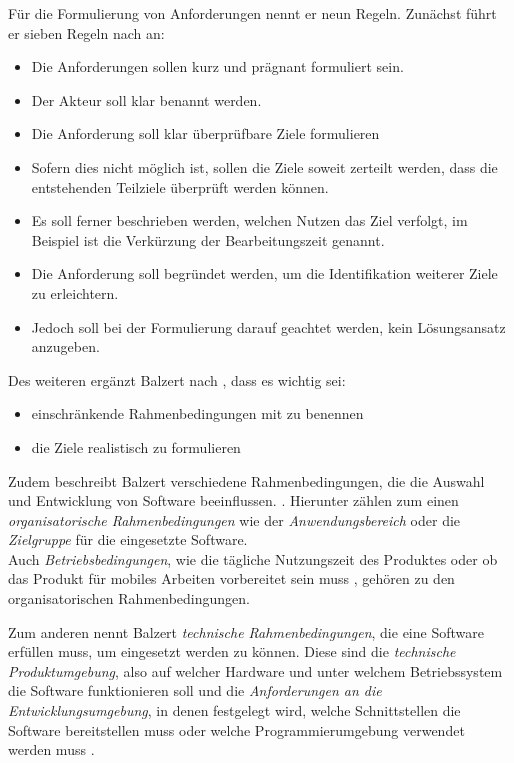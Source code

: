 Für die Formulierung von Anforderungen nennt er neun Regeln. Zunächst führt er sieben Regeln nach \cite[][S. 100 ff.]{Pohl2007} an:
\begin{itemize}
\item Die Anforderungen sollen kurz und prägnant formuliert sein. 
\item Der Akteur soll klar benannt werden.
\item Die Anforderung soll klar überprüfbare Ziele formulieren
\item Sofern dies nicht möglich ist, sollen die Ziele soweit zerteilt werden, dass die entstehenden Teilziele überprüft werden können.
\item Es soll ferner beschrieben werden, welchen Nutzen das Ziel verfolgt, im Beispiel ist die Verkürzung der Bearbeitungszeit genannt.
\item Die Anforderung soll begründet werden, um die Identifikation weiterer Ziele zu erleichtern. 
\item Jedoch soll bei der Formulierung darauf geachtet werden, kein Lösungsansatz anzugeben. 
\end{itemize}
Des weiteren ergänzt Balzert nach \cite[][S. 100 f.]{Rupp2007}, dass es wichtig sei:
\begin{itemize}
\item einschränkende Rahmenbedingungen mit zu benennen 
\item die Ziele realistisch zu formulieren 
\end{itemize}
\citep[für den gesamten Abschnitt vgl.][S. 457 ff.]{Balzert2010}


Zudem beschreibt Balzert verschiedene Rahmenbedingungen, die die Auswahl und Entwicklung von Software beeinflussen. \citep[][459]{Balzert2010}.
Hierunter zählen zum einen \textit{organisatorische Rahmenbedingungen} wie der \textit{Anwendungsbereich} oder die \textit{Zielgruppe} für die eingesetzte Software. \\
Auch \textit{Betriebsbedingungen}, wie die tägliche Nutzungszeit des Produktes oder ob das Produkt \zb für mobiles Arbeiten vorbereitet sein muss \citep[vgl.][S. 459 f.]{Balzert2010}, gehören zu den organisatorischen Rahmenbedingungen.

Zum anderen nennt Balzert \textit{technische Rahmenbedingungen}, die eine Software erfüllen muss, um eingesetzt werden zu können. Diese sind die \textit{technische Produktumgebung}, also auf welcher Hardware und unter welchem Betriebssystem die Software funktionieren soll und die \textit{Anforderungen an die Entwicklungsumgebung}, in denen \ua festgelegt wird, welche Schnittstellen die Software bereitstellen muss oder welche Programmierumgebung verwendet werden muss \citep[vgl.][S. 460 f.]{Balzert2010}.

